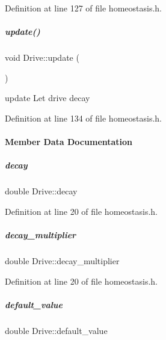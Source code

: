 Definition at line 127 of file homeostasis.\+h.

\mbox{\label{group__homeostasis_af22888e6ca70ca223fe71abebd84d90b}} 
\subparagraph{\texorpdfstring{update()}{update()}}
{\footnotesize\ttfamily void Drive\+::update (\begin{DoxyParamCaption}{ }\end{DoxyParamCaption})\hspace{0.3cm}{\ttfamily [inline]}}



update Let drive decay 



Definition at line 134 of file homeostasis.\+h.



\paragraph{Member Data Documentation}
\mbox{\label{group__homeostasis_abaa8695fc4e715e87a74de50235483d8}} 
\subparagraph{\texorpdfstring{decay}{decay}}
{\footnotesize\ttfamily double Drive\+::decay}



Definition at line 20 of file homeostasis.\+h.

\mbox{\label{group__homeostasis_a04fc66af39d34d19820117c43b242d84}} 
\subparagraph{\texorpdfstring{decay\+\_\+multiplier}{decay\_multiplier}}
{\footnotesize\ttfamily double Drive\+::decay\+\_\+multiplier}



Definition at line 20 of file homeostasis.\+h.

\mbox{\label{group__homeostasis_ad6ddf46ef65af0862fc35509fcde039e}} 
\subparagraph{\texorpdfstring{default\+\_\+value}{default\_value}}
{\footnotesize\ttfamily double Drive\+::default\+\_\+value}



